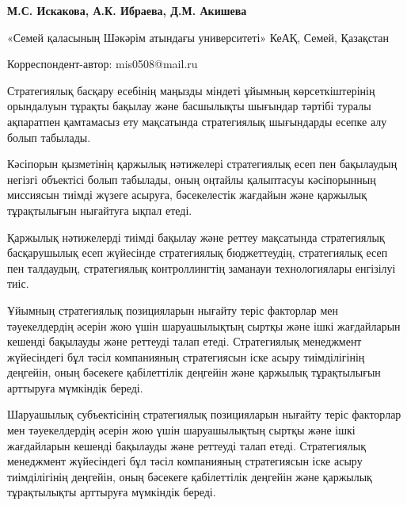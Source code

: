 
\begin{articleheader}

{\bfseries
М.С. Искакова\textsuperscript{\envelope },
А.К. Ибраева,
Д.М. Акишева
}
\end{articleheader}

\begin{affiliation}
«Семей қаласының Шәкәрім атындағы университеті» КеАҚ, Семей, Қазақстан

\raggedright \textsuperscript{\envelope }Корреспондент-автор: mis0508@mail.ru
\end{affiliation}

Стратегиялық басқару есебінің маңызды міндеті ұйымның көрсеткіштерінің
орындалуын тұрақты бақылау және басшылықты шығындар тәртібі туралы
ақпаратпен қамтамасыз ету мақсатында стратегиялық шығындарды есепке алу
болып табылады.

Кәсіпорын қызметінің қаржылық нәтижелері стратегиялық есеп пен
бақылаудың негізгі объектісі болып табылады, оның оңтайлы қалыптасуы
кәсіпорынның миссиясын тиімді жүзеге асыруға, бәсекелестік жағдайын және
қаржылық тұрақтылығын нығайтуға ықпал етеді.

Қаржылық нәтижелерді тиімді бақылау және реттеу мақсатында стратегиялық
басқарушылық есеп жүйесінде стратегиялық бюджеттеудің, стратегиялық есеп
пен талдаудың, стратегиялық контроллингтің заманауи технологиялары
енгізілуі тиіс.

Ұйымның стратегиялық позицияларын нығайту теріс факторлар мен
тәуекелдердің әсерін жою үшін шаруашылықтың сыртқы және ішкі жағдайларын
кешенді бақылауды және реттеуді талап етеді. Стратегиялық менеджмент
жүйесіндегі бұл тәсіл компанияның стратегиясын іске асыру тиімділігінің
деңгейін, оның бәсекеге қабілеттілік деңгейін және қаржылық тұрақтылығын
арттыруға мүмкіндік береді.

Шаруашылық субъектісінің стратегиялық позицияларын нығайту теріс
факторлар мен тәуекелдердің әсерін жою үшін шаруашылықтың сыртқы және
ішкі жағдайларын кешенді бақылауды және реттеуді талап етеді.
Стратегиялық менеджмент жүйесіндегі бұл тәсіл компанияның стратегиясын
іске асыру тиімділігінің деңгейін, оның бәсекеге қабілеттілік деңгейін
және қаржылық тұрақтылықты арттыруға мүмкіндік береді.

